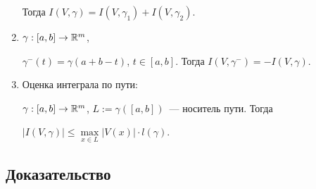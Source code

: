 \documentclass{article}
\begin{document}
\begin{enumerate}
                Тогда $I \left( V, \gamma \right) = I \left( V, \gamma_1 \right) + I \left( V, \gamma_2 \right)$.
            
            \item $\gamma : [a, b] \rightarrow \mathbb{R}^m$,
            
                $\gamma^- (t) = \gamma(a + b - t)$, $t \in [a, b]$. Тогда $I \left( V, \gamma^- \right) = - I \left( V, \gamma \right)$.
                
            \item Оценка интеграла по пути:
            
                $\gamma : [a, b] \rightarrow \mathbb{R}^m$, $L := \gamma \left( [a, b] \right)$~--- носитель пути. Тогда
                
                $\left| I \left( V, \gamma \right) \right| \leq \max\limits_{x \in L} \left| V(x) \right| \cdot l (\gamma)$.
                
        \end{enumerate}
        
        \subsection{Доказательство}
        
\end{document}
